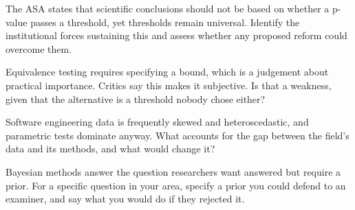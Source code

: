 \begin{reviewq}
  \item The ASA states that scientific conclusions should not be based on
    whether a p-value passes a threshold, yet thresholds remain universal.
    Identify the institutional forces sustaining this and assess whether any
    proposed reform could overcome them.
  \item Equivalence testing requires specifying a bound, which is a judgement
    about practical importance. Critics say this makes it subjective. Is that a
    weakness, given that the alternative is a threshold nobody chose either?
  \item Software engineering data is frequently skewed and heteroscedastic, and
    parametric tests dominate anyway. What accounts for the gap between the
    field's data and its methods, and what would change it?
  \item Bayesian methods answer the question researchers want answered but
    require a prior. For a specific question in your area, specify a prior you
    could defend to an examiner, and say what you would do if they rejected it.
\end{reviewq}
